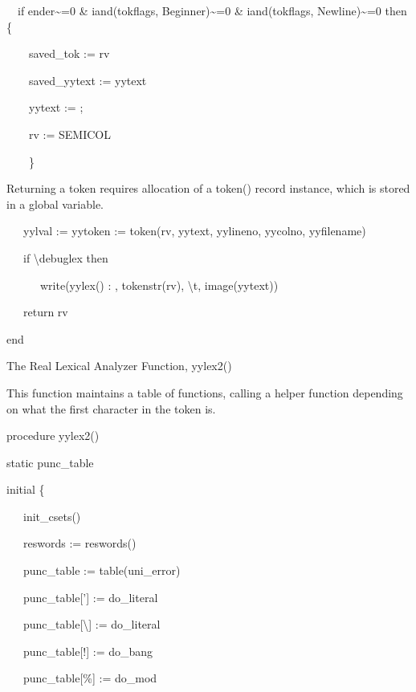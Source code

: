 {\ttfamily\mdseries
\ \ if ender\~{}=0 \& iand(tokflags, Beginner)\~{}=0 \& iand(tokflags, Newline)\~{}=0 then \{}

{\ttfamily\mdseries
\ \ \ \ saved\_tok := rv}

{\ttfamily\mdseries
\ \ \ \ saved\_yytext := yytext}

{\ttfamily\mdseries
\ \ \ \ yytext := {\textquotedbl};{\textquotedbl}}

{\ttfamily\mdseries
\ \ \ \ rv := SEMICOL}

{\ttfamily\mdseries
\ \ \ \ \}}

Returning a token requires allocation of a token() record instance,
which is stored in a global variable.

{\ttfamily\mdseries
\ \ \ yylval := yytoken := token(rv, yytext, yylineno, yycolno, yyfilename)}

{\ttfamily\mdseries
\ \ \ if {\textbackslash}debuglex then}

{\ttfamily\mdseries
\ \ \ \ \ \ write({\textquotedbl}yylex() : {\textquotedbl}, tokenstr(rv),
{\textquotedbl}{\textbackslash}t{\textquotedbl}, image(yytext))}

{\ttfamily\mdseries
\ \ \ return rv}

{\ttfamily\mdseries
end}

{\sffamily
The Real Lexical Analyzer Function, yylex2()}

This function maintains a table of functions, calling a helper
function depending on what the first character in the token is.

{\ttfamily\mdseries
procedure yylex2()}

{\ttfamily\mdseries
static punc\_table}

{\ttfamily\mdseries
initial \{}

{\ttfamily\mdseries
\ \ \ init\_csets()}

{\ttfamily\mdseries
\ \ \ reswords := reswords()}

{\ttfamily\mdseries
\ \ \ punc\_table := table(uni\_error)}

{\ttfamily\mdseries
\ \ \ punc\_table[{\textquotedbl}'{\textquotedbl}] := do\_literal}

{\ttfamily\mdseries
\ \ \ punc\_table[{\textquotedbl}{\textbackslash}{\textquotedbl}{\textquotedbl}] := do\_literal}

{\ttfamily\mdseries
\ \ \ punc\_table[{\textquotedbl}!{\textquotedbl}] := do\_bang}

{\ttfamily\mdseries
\ \ \ punc\_table[{\textquotedbl}\%{\textquotedbl}] := do\_mod}

